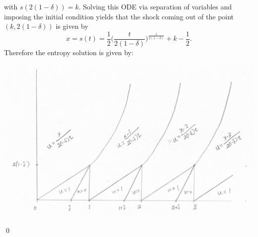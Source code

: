 with $s(2(1 - \delta)) = k$.
Solving this ODE via separation of variables and imposing the initial condition yields that the shock coming out of the point $(k, 2(1 - \delta))$ is given by
$$x= s(t) = \frac{1}{2}\bigg(\frac{t}{2(1 - \delta)}\bigg)^{\frac{1}{2(1 - \delta)}} + k - \frac{1}{2}.$$
Therefore the entropy solution is given by:
\begin{center}
\includegraphics[scale=0.35]{./_Figures/S14Q8b.png}
\end{center}
\hfill\qed
